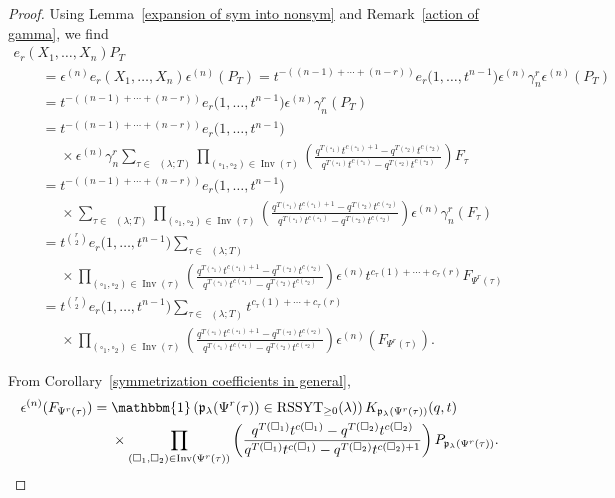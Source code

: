 \documentclass[10pt,a4paper]{amsart}
\numberwithin{equation}{section}
\theoremstyle{definition}
\DeclareMathOperator{\PSYT}{\mathrm{PSYT}_{\geq 0}}
\DeclareMathOperator{\RSSYT}{\mathrm{RSSYT}_{\geq 0}}
\DeclareMathOperator{\Inv}{\mathrm{Inv}}
\begin{document}
\begin{proof}
Using Lemma~\ref{expansion of sym into nonsym} and Remark~\ref{action of gamma}, we find
 \begin{gather*}
 e_r(X_1,\dots, X_n)P_T \\
 \qquad = \epsilon^{(n)}e_r(X_1,\dots, X_n)\epsilon^{(n)}(P_T)
 = t^{-((n-1)+\cdots +(n-r))}e_r\bigl(1,\dots, t^{n-1}\bigr)\epsilon^{(n)}\gamma_n^{r} \epsilon^{(n)}(P_T) \\
 \qquad = t^{-((n-1)+\cdots +(n-r))}e_r\bigl(1,\dots, t^{n-1}\bigr)\epsilon^{(n)}\gamma_n^{r}(P_T) \\
 \qquad = t^{-((n-1)+\cdots +(n-r))}e_r\bigl(1,\dots, t^{n-1}\bigr) \\
 \phantom{\qquad =}{} \times \epsilon^{(n)}\gamma_n^{r} \sum_{\tau \in \PSYT(\lambda;T)} \prod_{(\square_1,\square_2) \in \Inv(\tau)} \left( \frac{q^{T(\square_1)}t^{c(\square_1) +1} - q^{T(\square_2)}t^{c(\square_2) }}{q^{T(\square_1)}t^{c(\square_1)} - q^{T(\square_2)}t^{c(\square_2)}} \right) F_{\tau} \\
 \qquad =t^{-((n-1)+\cdots +(n-r))}e_r\bigl(1,\dots, t^{n-1}\bigr) \\
 \phantom{\qquad =}{} \times \sum_{\tau \in \PSYT(\lambda;T)} \prod_{(\square_1,\square_2) \in \Inv(\tau)} \left( \frac{q^{T(\square_1)}t^{c(\square_1) +1} - q^{T(\square_2)}t^{c(\square_2) }}{q^{T(\square_1)}t^{c(\square_1)} - q^{T(\square_2)}t^{c(\square_2)}} \right) \epsilon^{(n)}\gamma_n^{r}(F_{\tau}) \\
 \qquad =t^{r \choose 2}e_r\bigl(1,\dots, t^{n-1}\bigr)\sum_{\tau \in \PSYT(\lambda;T)} \\
 \phantom{\qquad =}{} \times \prod_{(\square_1,\square_2) \in \Inv(\tau)} \left( \frac{q^{T(\square_1)}t^{c(\square_1) +1} - q^{T(\square_2)}t^{c(\square_2) }}{q^{T(\square_1)}t^{c(\square_1)} - q^{T(\square_2)}t^{c(\square_2)}} \right) \epsilon^{(n)}t^{c_{\tau}(1)+\cdots + c_{\tau}(r)} F_{\Psi^{r}(\tau)} \\
 \qquad = t^{r \choose 2}e_r\bigl(1,\dots, t^{n-1}\bigr) \sum_{\tau \in \PSYT(\lambda;T)}t^{c_{\tau}(1)+\cdots + c_{\tau}(r)} \\
 \phantom{\qquad =}{} \times \prod_{(\square_1,\square_2) \in \Inv(\tau)} \left( \frac{q^{T(\square_1)}t^{c(\square_1) +1} - q^{T(\square_2)}t^{c(\square_2) }}{q^{T(\square_1)}t^{c(\square_1)} - q^{T(\square_2)}t^{c(\square_2)}} \right) \epsilon^{(n)}( F_{\Psi^{r}(\tau)}).
 \end{gather*}

 From Corollary~\ref{symmetrization coefficients in general},
\begin{align*}
 \epsilon^{(n)}( F_{\Psi^{r}(\tau)})
 ={}&
 \mathbbm{1}\left(\mathfrak{p}_{\lambda}(\Psi^{r}(\tau)) \in \RSSYT(\lambda)\right) K_{\mathfrak{p}_{\lambda}(\Psi^{r}(\tau))}(q,t) \\
 &\times \prod_{(\square_1,\square_2) \in \Inv(\Psi^{r}(\tau))} \left( \frac{q^{T(\square_1)}t^{c(\square_1) } - q^{T(\square_2)}t^{c(\square_2) }}{q^{T(\square_1)}t^{c(\square_1)} - q^{T(\square_2)}t^{c(\square_2)+1}} \right) P_{\mathfrak{p}_{\lambda}(\Psi^{r}(\tau))}.
\end{align*}



\end{proof}
\end{document}
